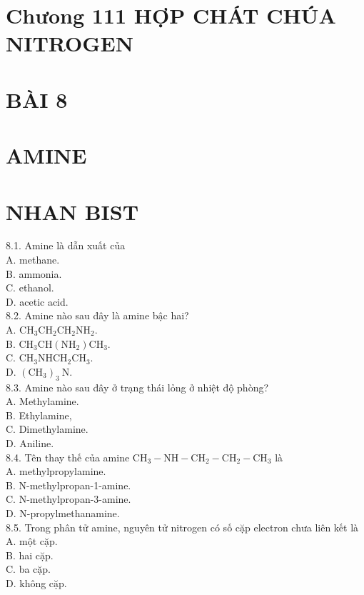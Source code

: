 \documentclass[10pt]{article}
\begin{document}
\section*{Chưong 111 HỢP CHÁT CHÚA NITROGEN}
\section*{BÀI 8}
\section*{AMINE}
\section*{NHAN BIST}
8.1. Amine là dẫn xuất của\\
A. methane.\\
B. ammonia.\\
C. ethanol.\\
D. acetic acid.\\
8.2. Amine nào sau đây là amine bậc hai?\\
A. $\mathrm{CH}_{3} \mathrm{CH}_{2} \mathrm{CH}_{2} \mathrm{NH}_{2}$.\\
B. $\mathrm{CH}_{3} \mathrm{CH}\left(\mathrm{NH}_{2}\right) \mathrm{CH}_{3}$.\\
C. $\mathrm{CH}_{3} \mathrm{NHCH}_{2} \mathrm{CH}_{3}$.\\
D. $\left(\mathrm{CH}_{3}\right)_{3} \mathrm{~N}$.\\
8.3. Amine nào sau đây ở trạng thái lỏng ở nhiệt độ phòng?\\
A. Methylamine.\\
B. Ethylamine,\\
C. Dimethylamine.\\
D. Aniline.\\
8.4. Tên thay thế của amine $\mathrm{CH}_{3}-\mathrm{NH}-\mathrm{CH}_{2}-\mathrm{CH}_{2}-\mathrm{CH}_{3}$ là\\
A. methylpropylamine.\\
B. N-methylpropan-1-amine.\\
C. N-methylpropan-3-amine.\\
D. N-propylmethanamine.\\
8.5. Trong phân tử amine, nguyên tử nitrogen có số cặp electron chưa liên kết là\\
A. một cặp.\\
B. hai cặp.\\
C. ba cặp.\\
D. không cặp.\\
\end{document}
